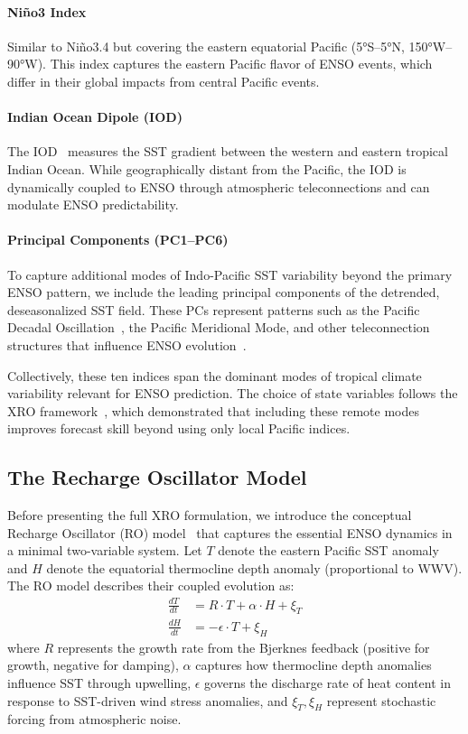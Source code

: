 \paragraph{Ni\~no3 Index} Similar to Ni\~no3.4 but covering the eastern equatorial Pacific (5°S--5°N, 150°W--90°W). This index captures the eastern Pacific flavor of ENSO events, which differ in their global impacts from central Pacific events.

\paragraph{Indian Ocean Dipole (IOD)} The IOD~\cite{saji1999dipole} measures the SST gradient between the western and eastern tropical Indian Ocean. While geographically distant from the Pacific, the IOD is dynamically coupled to ENSO through atmospheric teleconnections and can modulate ENSO predictability.

\paragraph{Principal Components (PC1--PC6)} To capture additional modes of Indo-Pacific SST variability beyond the primary ENSO pattern, we include the leading principal components of the detrended, deseasonalized SST field. These PCs represent patterns such as the Pacific Decadal Oscillation~\cite{mantua1997pacific}, the Pacific Meridional Mode, and other teleconnection structures that influence ENSO evolution~\cite{chiang2002tropical}.

Collectively, these ten indices span the dominant modes of tropical climate variability relevant for ENSO prediction. The choice of state variables follows the XRO framework~\cite{zhao2024xro}, which demonstrated that including these remote modes improves forecast skill beyond using only local Pacific indices.

\subsection{The Recharge Oscillator Model}

Before presenting the full XRO formulation, we introduce the conceptual Recharge Oscillator (RO) model~\cite{jin1997equatorial,burgers2005enso} that captures the essential ENSO dynamics in a minimal two-variable system. Let $T$ denote the eastern Pacific SST anomaly and $H$ denote the equatorial thermocline depth anomaly (proportional to WWV). The RO model describes their coupled evolution as:
\begin{align}
    \frac{dT}{dt} &= R \cdot T + \alpha \cdot H + \xi_T \label{eq:ro_t} \\
    \frac{dH}{dt} &= -\epsilon \cdot T + \xi_H \label{eq:ro_h}
\end{align}
where $R$ represents the growth rate from the Bjerknes feedback (positive for growth, negative for damping), $\alpha$ captures how thermocline depth anomalies influence SST through upwelling, $\epsilon$ governs the discharge rate of heat content in response to SST-driven wind stress anomalies, and $\xi_T, \xi_H$ represent stochastic forcing from atmospheric noise.

